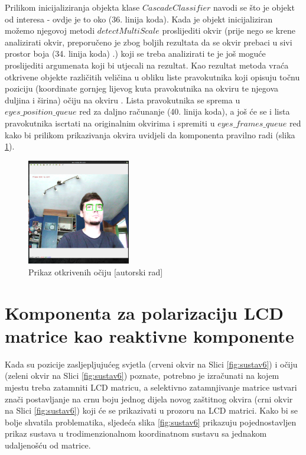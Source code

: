 \documentclass{foi}
\begin{document}
Prilikom inicijaliziranja objekta klase $CascadeClassifier$ navodi se što je objekt od interesa - ovdje je to oko (36. linija koda). Kada je objekt inicijaliziran možemo njegovoj metodi $detectMultiScale$ proslijediti okvir (prije nego se krene analizirati okvir, preporučeno je zbog boljih rezultata da se okvir prebaci u sivi prostor boja (34. linija koda) \cite{OpenCV5}.) koji se treba analizirati te je još moguće proslijediti argumenata koji bi utjecali na rezultat. Kao rezultat metoda vraća otkrivene objekte različitih veličina u obliku liste pravokutnika koji opisuju točnu poziciju (koordinate gornjeg lijevog kuta pravokutnika na okviru te njegova duljina i širina) očiju na okviru \cite{OpenCV6}. Lista pravokutnika se sprema u $eyes\_position\_queue$ red za daljno računanje (40. linija koda), a još će se i lista pravokutnika iscrtati na originalnim okvirima i spremiti u $eyes\_frames\_queue$ red kako bi prilikom prikazivanja okvira uvidjeli da komponenta pravilno radi (slika \ref{fig:sustav3}).

\begin{figure}[h!]
    \centering
    \includegraphics[width=0.4\textwidth]{slike/sustav3}
    \caption{Prikaz otkrivenih očiju [autorski rad]}
    \label{fig:sustav3}
\end{figure}

\pagebreak
\section{Komponenta za polarizaciju LCD matrice kao reaktivne komponente}

Kada su pozicije zasljepljujućeg svjetla (crveni okvir na Slici \ref{fig:sustav6}) i očiju (zeleni okvir na Slici \ref{fig:sustav6}) poznate, potrebno je izračunati na kojem mjestu treba zatamniti LCD matricu, a selektivno zatamnjivanje matrice ustvari znači postavljanje na crnu boju jednog dijela novog zaštitnog okvira (crni okvir na Slici \ref{fig:sustav6}) koji će se prikazivati u prozoru na LCD matrici. Kako bi se bolje shvatila problematika, sljedeća slika \ref{fig:sustav6} prikazuju pojednostavljen prikaz sustava u trodimenzionalnom koordinatnom sustavu sa jednakom udaljenošću od matrice.
\end{document}
